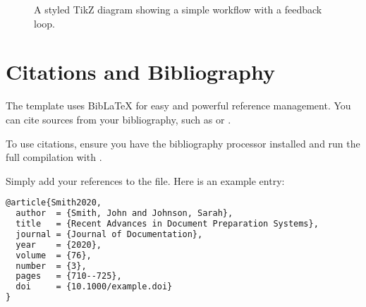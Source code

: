 \documentclass[a4paper,11pt]{report}
\begin{document}
\begin{figure}[h!]
    \centering
    \caption{A styled TikZ diagram showing a simple workflow with a feedback loop.}
    \label{fig:tikzflow}
\end{figure}

\section{Citations and Bibliography}
The template uses BibLaTeX for easy and powerful reference management. You can cite sources from your bibliography, such as \cite{Smith2020} or \cite{Lamport1994}.

\begin{notetbox}
    To use citations, ensure you have the  bibliography processor installed and run the full compilation with .
\end{notetbox}

Simply add your references to the  file. Here is an example entry:
\begin{lstlisting}[language=TeX, caption={Example reference entry in references.bib}, label={lst:reference}]
@article{Smith2020,
  author  = {Smith, John and Johnson, Sarah},
  title   = {Recent Advances in Document Preparation Systems},
  journal = {Journal of Documentation},
  year    = {2020},
  volume  = {76},
  number  = {3},
  pages   = {710--725},
  doi     = {10.1000/example.doi}
}
\end{lstlisting}
\end{document}
